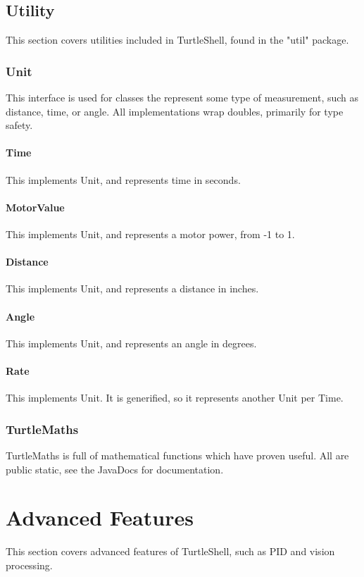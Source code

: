 \documentclass[]{report}
\begin{document}
\subsection{Utility}
This section covers utilities included in TurtleShell, found in the "util" package.

\subsubsection{Unit}
This interface is used for classes the represent some type of measurement, such as distance, time, or angle.
All implementations wrap doubles, primarily for type safety.

\paragraph{Time}
This implements Unit, and represents time in seconds.
\paragraph{MotorValue}
This implements Unit, and represents a motor power, from -1 to 1.
\paragraph{Distance}
This implements Unit, and represents a distance in inches.
\paragraph{Angle}
This implements Unit, and represents an angle in degrees.
\paragraph{Rate}
This implements Unit. It is generified, so it represents another Unit per Time.

\subsubsection{TurtleMaths}
TurtleMaths is full of mathematical functions which have proven useful. All are public static, see the JavaDocs for documentation.

\section{Advanced Features}
This section covers advanced features of TurtleShell, such as PID and vision processing.
\end{document}
